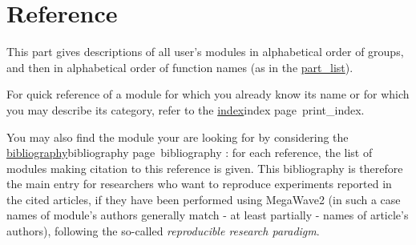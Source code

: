 %
%


\part{Reference}
\label{part_reference}

This part gives descriptions of all user's modules in alphabetical order
of groups, and then in alphabetical order of function names (as in the
\hyperref{list given here}{list given by Part~}{}{part_list}). 

For quick reference of a module for which you already know its name or for which 
you may describe its category, refer to the \hyperref[pageref]{index}{index page~}{}{print_index}. 

You may also find the module your are looking for by considering the 
\hyperref[pageref]{bibliography}{bibliography page~}{}{bibliography} :
for each reference, the list of modules making citation to this reference is given.
This bibliography is therefore the main entry for researchers 
who want to reproduce experiments reported in the cited articles, if they have been
performed using MegaWave2 (in such a case names of module's authors generally match
- at least partially - names of article's authors), following the so-called {\em reproducible
research paradigm}.

\newpage

